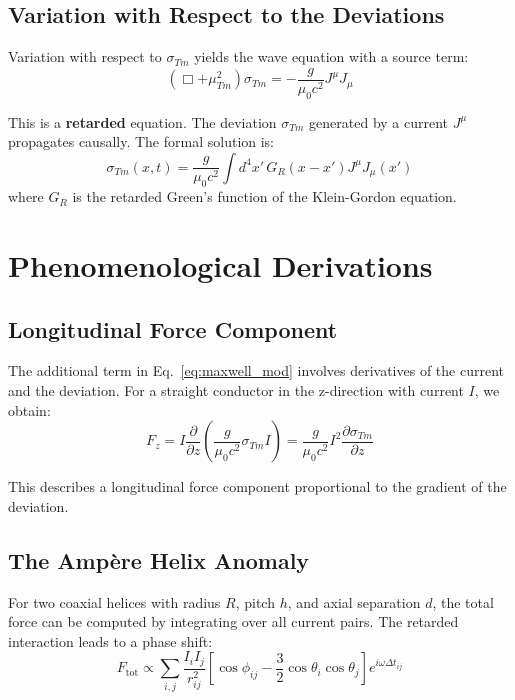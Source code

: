 \documentclass[10pt, a4paper]{article}
\begin{document}
	\subsection{Variation with Respect to the Deviations}
	Variation with respect to $\sigma_{Tm}$ yields the wave equation with a source term:
	\begin{equation}
		(\Box + \mu_{Tm}^2) \sigma_{Tm} = -\frac{g}{\mu_0 c^2} J^\mu J_\mu \label{eq:sigma_eq}
	\end{equation}
	
	This is a \textbf{retarded} equation. The deviation $\sigma_{Tm}$ generated by a current $J^\mu$ propagates causally. The formal solution is:
	\begin{equation}
		\sigma_{Tm}(x,t) = \frac{g}{\mu_0 c^2} \int d^4x' \, G_R(x-x') J^\mu J_\mu(x') \label{eq:sigma_solution}
	\end{equation}
	where $G_R$ is the retarded Green’s function of the Klein-Gordon equation.
	
	\section{Phenomenological Derivations}
	\subsection{Longitudinal Force Component}
	The additional term in Eq.~\ref{eq:maxwell_mod} involves derivatives of the current and the deviation. For a straight conductor in the z-direction with current $I$, we obtain:
	\begin{equation}
		F_z = I \frac{\partial}{\partial z} \left( \frac{g}{\mu_0 c^2} \sigma_{Tm} I \right) = \frac{g}{\mu_0 c^2} I^2 \frac{\partial \sigma_{Tm}}{\partial z} \label{eq:long_force}
	\end{equation}
	
	This describes a longitudinal force component proportional to the gradient of the deviation.
	
	\subsection{The Ampère Helix Anomaly}
	For two coaxial helices with radius $R$, pitch $h$, and axial separation $d$, the total force can be computed by integrating over all current pairs. The retarded interaction leads to a phase shift:
	\begin{equation}
		F_{\text{tot}} \propto \sum_{i,j} \frac{I_i I_j}{r_{ij}^2} \left[ \cos\phi_{ij} - \frac{3}{2} \cos\theta_i \cos\theta_j \right] e^{i\omega \Delta t_{ij}} \label{eq:helix_force}
	\end{equation}
	
\end{document}
